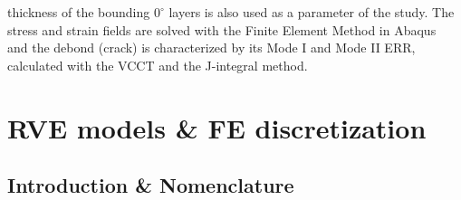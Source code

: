 \documentclass[review]{elsarticle}
\begin{document}
thickness of the bounding $0^{\circ}$ layers is also used as a parameter of the study. The stress and strain fields are solved with the Finite Element Method in Abaqus~\cite{abq12} and the debond (crack) is characterized by its Mode I and Mode II ERR, calculated with the VCCT and the J-integral method.


\section{RVE models \& FE discretization}


\subsection{Introduction \& Nomenclature}\label{subsec:names}
\end{document}
